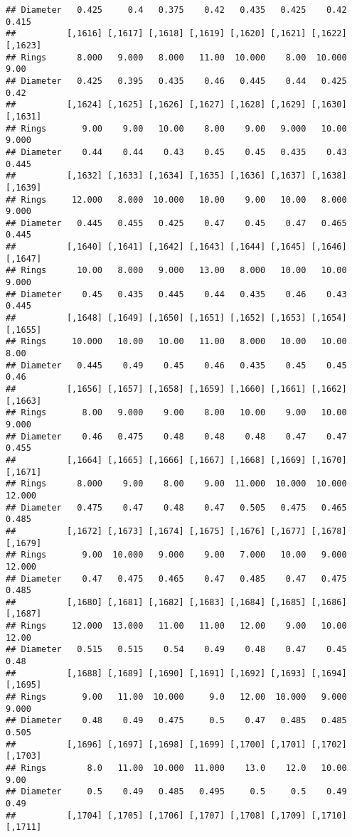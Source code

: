 \documentclass[
]{article}
\begin{document}
\begin{verbatim}
## Diameter   0.425     0.4   0.375    0.42   0.435   0.425    0.42   0.415
##          [,1616] [,1617] [,1618] [,1619] [,1620] [,1621] [,1622] [,1623]
## Rings      8.000   9.000   8.000   11.00  10.000    8.00  10.000    9.00
## Diameter   0.425   0.395   0.435    0.46   0.445    0.44   0.425    0.42
##          [,1624] [,1625] [,1626] [,1627] [,1628] [,1629] [,1630] [,1631]
## Rings       9.00    9.00   10.00    8.00    9.00   9.000   10.00   9.000
## Diameter    0.44    0.44    0.43    0.45    0.45   0.435    0.43   0.445
##          [,1632] [,1633] [,1634] [,1635] [,1636] [,1637] [,1638] [,1639]
## Rings     12.000   8.000  10.000   10.00    9.00   10.00   8.000   9.000
## Diameter   0.445   0.455   0.425    0.47    0.45    0.47   0.465   0.445
##          [,1640] [,1641] [,1642] [,1643] [,1644] [,1645] [,1646] [,1647]
## Rings      10.00   8.000   9.000   13.00   8.000   10.00   10.00   9.000
## Diameter    0.45   0.435   0.445    0.44   0.435    0.46    0.43   0.445
##          [,1648] [,1649] [,1650] [,1651] [,1652] [,1653] [,1654] [,1655]
## Rings     10.000   10.00   10.00   11.00   8.000   10.00   10.00    8.00
## Diameter   0.445    0.49    0.45    0.46   0.435    0.45    0.45    0.46
##          [,1656] [,1657] [,1658] [,1659] [,1660] [,1661] [,1662] [,1663]
## Rings       8.00   9.000    9.00    8.00   10.00    9.00   10.00   9.000
## Diameter    0.46   0.475    0.48    0.48    0.48    0.47    0.47   0.455
##          [,1664] [,1665] [,1666] [,1667] [,1668] [,1669] [,1670] [,1671]
## Rings      8.000    9.00    8.00    9.00  11.000  10.000  10.000  12.000
## Diameter   0.475    0.47    0.48    0.47   0.505   0.475   0.465   0.485
##          [,1672] [,1673] [,1674] [,1675] [,1676] [,1677] [,1678] [,1679]
## Rings       9.00  10.000   9.000    9.00   7.000   10.00   9.000  12.000
## Diameter    0.47   0.475   0.465    0.47   0.485    0.47   0.475   0.485
##          [,1680] [,1681] [,1682] [,1683] [,1684] [,1685] [,1686] [,1687]
## Rings     12.000  13.000   11.00   11.00   12.00    9.00   10.00   12.00
## Diameter   0.515   0.515    0.54    0.49    0.48    0.47    0.45    0.48
##          [,1688] [,1689] [,1690] [,1691] [,1692] [,1693] [,1694] [,1695]
## Rings       9.00   11.00  10.000     9.0   12.00  10.000   9.000   9.000
## Diameter    0.48    0.49   0.475     0.5    0.47   0.485   0.485   0.505
##          [,1696] [,1697] [,1698] [,1699] [,1700] [,1701] [,1702] [,1703]
## Rings        8.0   11.00  10.000  11.000    13.0    12.0   10.00    9.00
## Diameter     0.5    0.49   0.485   0.495     0.5     0.5    0.49    0.49
##          [,1704] [,1705] [,1706] [,1707] [,1708] [,1709] [,1710] [,1711]

\end{verbatim}
\end{document}
